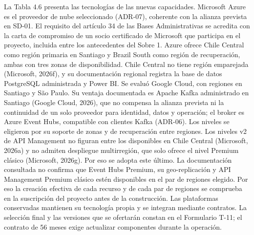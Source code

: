 \documentclass[11pt]{article}
\begin{document}
La Tabla 4.6 presenta las tecnologías de las nuevas capacidades. Microsoft Azure es el proveedor de nube seleccionado (ADR-07), coherente con la alianza prevista en SD-01. El requisito del artículo 34 de las Bases Administrativas se acredita con la carta de compromiso de un socio certificado de Microsoft que participa en el proyecto, incluida entre los antecedentes del Sobre 1. Azure ofrece Chile Central como región primaria en Santiago y Brazil South como región de recuperación, ambas con tres zonas de disponibilidad. Chile Central no tiene región emparejada (Microsoft, 2026f), y su documentación regional registra la base de datos PostgreSQL administrada y Power BI. Se evaluó Google Cloud, con regiones en Santiago y São Paulo. Su ventaja documentada es Apache Kafka administrado en Santiago (Google Cloud, 2026), que no compensa la alianza prevista ni la continuidad de un solo proveedor para identidad, datos y operación; el broker es Azure Event Hubs, compatible con clientes Kafka (ADR-06). Los niveles se eligieron por su soporte de zonas y de recuperación entre regiones. Los niveles v2 de API Management no figuran entre los disponibles en Chile Central (Microsoft, 2026a) y no admiten despliegue multirregión, que solo ofrece el nivel Premium clásico (Microsoft, 2026g). Por eso se adopta este último. La documentación consultada no confirma que Event Hubs Premium, su geo-replicación y API Management Premium clásico estén disponibles en el par de regiones elegido. Por eso la creación efectiva de cada recurso y de cada par de regiones se comprueba en la suscripción del proyecto antes de la construcción. Las plataformas conservadas mantienen su tecnología propia y se integran mediante contratos. La selección final y las versiones que se ofertarán constan en el Formulario T-11; el contrato de 56 meses exige actualizar componentes durante la operación.

\par\vspace{0pt plus 10\baselineskip}\vspace{0pt plus -10\baselineskip}
\end{document}
